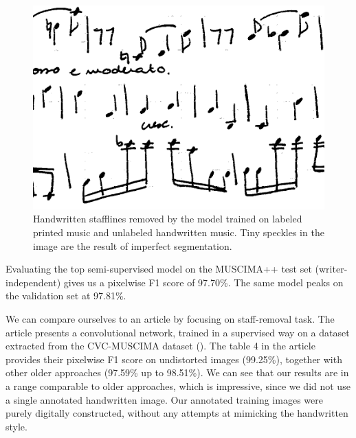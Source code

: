\begin{figure}[ht]
    \centering
    \includegraphics[width=140mm]{../../figures/04-staffline-transfer/staffline-removal.png}
    \caption{Handwritten stafflines removed by the model trained on labeled printed music and unlabeled handwritten music. Tiny speckles in the image are the result of imperfect segmentation.}
    \label{fig:StafflineRemoval}
\end{figure}

Evaluating the top semi-supervised model on the MUSCIMA++ test set (writer-independent) gives us a pixelwise F1 score of 97.70\%. The same model peaks on the validation set at 97.81\%. 

We can compare ourselves to an article by \cite{StafflineDetection} focusing on staff-removal task. The article presents a convolutional network, trained in a supervised way on a dataset extracted from the CVC-MUSCIMA dataset (\cite{CvcMuscima}). The table 4 in the article provides their pixelwise F1 score on undistorted images (99.25\%), together with other older approaches (97.59\% up to 98.51\%). We can see that our results are in a range comparable to older approaches, which is impressive, since we did not use a single annotated handwritten image. Our annotated training images were purely digitally constructed, without any attempts at mimicking the handwritten style.

